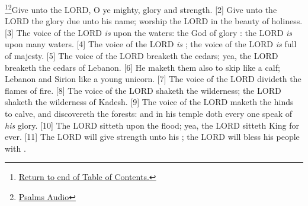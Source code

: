 \footnote{\textcolor[cmyk]{0.99998,1,0,0}{\hyperlink{TOC}{Return to end of Table of Contents.}}}\footnote{\href{https://audiobible.com/bible}{\textcolor[cmyk]{0.99998,1,0,0}{Psalms Audio}}}\textcolor[cmyk]{0.99998,1,0,0}{Give unto the LORD, O ye mighty,  glory and strength.}
[2] \textcolor[cmyk]{0.99998,1,0,0}{Give unto the LORD the glory due unto his name; worship the LORD in the beauty of holiness.}
[3] \textcolor[cmyk]{0.99998,1,0,0}{The voice of the LORD \emph{is} upon the waters: the God of glory : the LORD \emph{is} upon many waters.}
[4] \textcolor[cmyk]{0.99998,1,0,0}{The voice of the LORD \emph{is} ; the voice of the LORD \emph{is} full of majesty.}
[5] \textcolor[cmyk]{0.99998,1,0,0}{The voice of the LORD breaketh the cedars; yea, the LORD breaketh the cedars of Lebanon.}
[6] \textcolor[cmyk]{0.99998,1,0,0}{He maketh them also to skip like a calf; Lebanon and Sirion like a young unicorn.}
[7] \textcolor[cmyk]{0.99998,1,0,0}{The voice of the LORD divideth the flames of fire.}
[8] \textcolor[cmyk]{0.99998,1,0,0}{The voice of the LORD shaketh the wilderness; the LORD shaketh the wilderness of Kadesh.}
[9] \textcolor[cmyk]{0.99998,1,0,0}{The voice of the LORD maketh the hinds to calve, and discovereth the forests: and in his temple doth every one speak of \emph{his} glory.}
[10] \textcolor[cmyk]{0.99998,1,0,0}{The LORD sitteth upon the flood; yea, the LORD sitteth King for ever.}
[11] \textcolor[cmyk]{0.99998,1,0,0}{The LORD will give strength unto his ; the LORD will bless his people with .}


